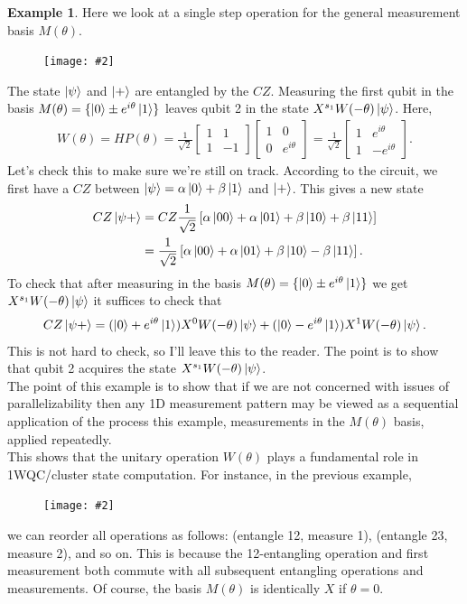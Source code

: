 \documentclass{book}
\theoremstyle{definition}
\newtheorem{exmp}{Example}[section]
\newcommand{\nn}{\nonumber}
\newcommand{\al}{\alpha}
\newcommand{\be}{\beta}
\newcommand{\f}[2]{\frac{#1}{#2}}
\newcommand{\lb}{\left[}
\newcommand{\rb}{\right]}
\newcommand{\fig}[2]{
	\begin{figure}[!htb]
		\centering
		\texttt{[image: \#2]}
	\end{figure}}
\begin{document}
\begin{exmp}
	Here we look at a single step operation for the general measurement basis $M(\theta)$.
	
	\fig{0.3}{fig7}
	
	The state $\ket{\psi}$ and $\ket{+}$ are entangled by the $CZ$. Measuring the first qubit in the basis $M(\theta) = \{ \ket{0} \pm e^{i\theta}\ket{1} \}$ leaves qubit 2 in the state $X^{s_1}W(-\theta)\ket{\psi}$. Here,
	\begin{align}
	W(\theta) = HP(\theta) = \f{1}{\sqrt{2}}\begin{bmatrix}
	1 & 1 \\  1 & -1
	\end{bmatrix}\begin{bmatrix}
	1 & 0 \\ 0 & e^{i\theta}
	\end{bmatrix} = \f{1}{\sqrt{2}}\begin{bmatrix}
	1 & e^{i\theta} \\ 1& -e^{i\theta}
	\end{bmatrix}.
	\end{align}
	Let's check this to make sure we're still on track. According to the circuit, we first have a $CZ$ between $\ket{\psi} = \al\ket{0} + \be\ket{1}$ and $\ket{+}$. This gives a new state
	\begin{align}
	CZ\ket{\psi+} &= CZ\f{1}{\sqrt{2}}\lb \al\ket{00} + \al\ket{01} + \be\ket{10} + \be\ket{11} \rb\nn\\
	&= \f{1}{\sqrt{2}}\lb \al\ket{00} + \al\ket{01} + \be\ket{10} - \be\ket{11} \rb.
	\end{align}
	To check that after measuring in the basis $M(\theta) = \{\ket{0} \pm e^{i\theta}\ket{1} \}$ we get $X^{s_1}W(-\theta)\ket{\psi}$ it suffices to check that 
	\begin{align}
	CZ\ket{\psi+} = (\ket{0} + e^{i\theta}\ket{1})X^0W(-\theta)\ket{\psi} + (\ket{0} - e^{i\theta}\ket{1})X^1 W(-\theta)\ket{\psi}.
	\end{align}
	This is not hard to check, so I'll leave this to the reader. The point is to show that qubit 2 acquires the state $X^{s_1}W(-\theta)\ket{\psi}$. \\
	
	The point of this example is to show that if we are not concerned with issues of parallelizability then any 1D measurement pattern may be viewed as a sequential application of the process this example, measurements in the $M(\theta)$ basis, applied repeatedly. \\
	
	This shows that the unitary operation $W(\theta)$ plays a fundamental role in 1WQC/cluster state computation. For instance, in the previous example, 
	
	\fig{0.3}{rotate}
	
	we can reorder all operations as follows: (entangle 12, measure 1), (entangle 23, measure 2), and so on. This is because the 12-entangling operation and first measurement both commute with all subsequent entangling operations and measurements. Of course, the basis $M(\theta)$ is identically $X$ if $\theta = 0$.
\end{exmp}
\end{document}
